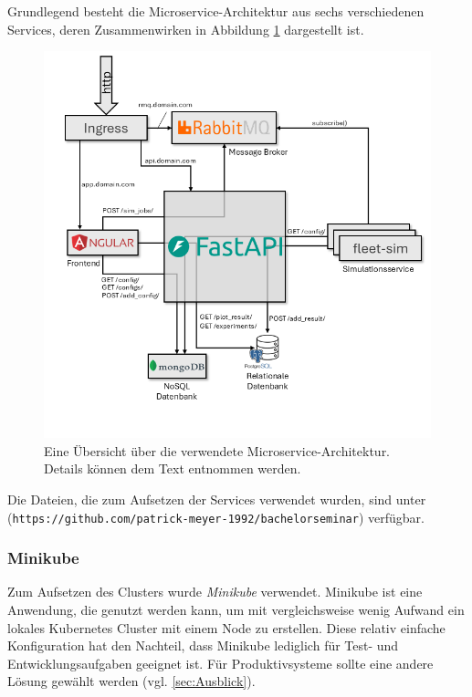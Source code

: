 \documentclass[11pt,a4paper]{article}
\begin{document}
Grundlegend besteht die Microservice-Architektur aus sechs verschiedenen Services, deren Zusammenwirken
in Abbildung \ref{fig:microservice-architektur} dargestellt ist.

\begin{figure}
	\label{fig:microservice-architektur}
	\centering
	\includegraphics[width=\textwidth]{media/Microservice-Architektur.png}
	\caption{
		Eine Übersicht über die verwendete Microservice-Architektur.
		Details können dem Text entnommen werden.
	}
\end{figure}

Die Dateien, die zum Aufsetzen der Services verwendet wurden, sind unter
(\lstinline|https://github.com/patrick-meyer-1992/bachelorseminar|) \cite{Meyer_bachelorseminar}
verfügbar.

\subsubsection{Minikube}
Zum Aufsetzen des Clusters wurde \emph{Minikube} verwendet.
Minikube ist eine Anwendung, die genutzt werden kann, um mit vergleichsweise wenig Aufwand ein lokales
Kubernetes Cluster mit einem Node zu erstellen. Diese relativ einfache Konfiguration hat 
den Nachteil, dass Minikube lediglich für Test- und Entwicklungsaufgaben geeignet ist.
Für Produktivsysteme sollte eine andere Lösung gewählt werden (vgl. \ref{sec:Ausblick}). 
\end{document}
